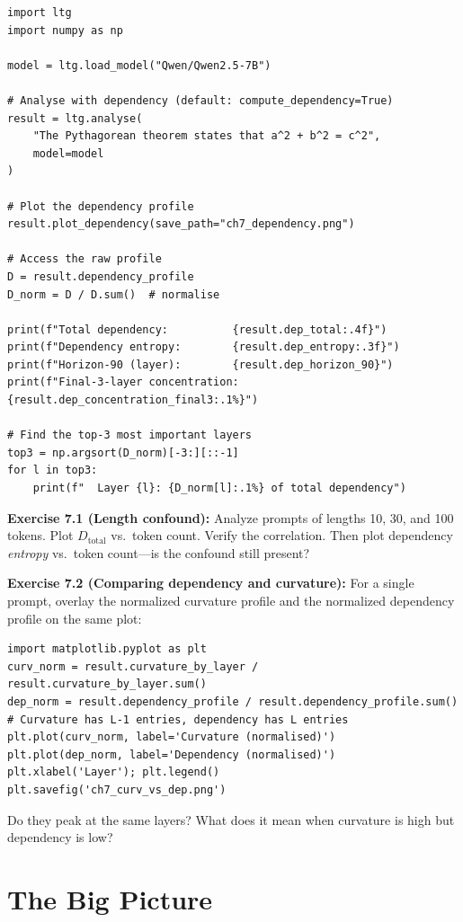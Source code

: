 \documentclass[11pt, twoside, openright]{memoir}
\begin{document}
\begin{lstlisting}[caption={Computing and visualising dependency profiles}]
import ltg
import numpy as np

model = ltg.load_model("Qwen/Qwen2.5-7B")

# Analyse with dependency (default: compute_dependency=True)
result = ltg.analyse(
    "The Pythagorean theorem states that a^2 + b^2 = c^2",
    model=model
)

# Plot the dependency profile
result.plot_dependency(save_path="ch7_dependency.png")

# Access the raw profile
D = result.dependency_profile
D_norm = D / D.sum()  # normalise

print(f"Total dependency:          {result.dep_total:.4f}")
print(f"Dependency entropy:        {result.dep_entropy:.3f}")
print(f"Horizon-90 (layer):        {result.dep_horizon_90}")
print(f"Final-3-layer concentration: {result.dep_concentration_final3:.1%}")

# Find the top-3 most important layers
top3 = np.argsort(D_norm)[-3:][::-1]
for l in top3:
    print(f"  Layer {l}: {D_norm[l]:.1%} of total dependency")
\end{lstlisting}

\begin{tryit}
\textbf{Exercise 7.1 (Length confound):} Analyze prompts of lengths 10, 30,
and 100 tokens. Plot $D_{\text{total}}$ vs.\ token count. Verify the
correlation. Then plot dependency \emph{entropy} vs.\ token count---is the
confound still present?

\textbf{Exercise 7.2 (Comparing dependency and curvature):} For a single
prompt, overlay the normalized curvature profile and the normalized
dependency profile on the same plot:
\begin{lstlisting}
import matplotlib.pyplot as plt
curv_norm = result.curvature_by_layer / result.curvature_by_layer.sum()
dep_norm = result.dependency_profile / result.dependency_profile.sum()
# Curvature has L-1 entries, dependency has L entries
plt.plot(curv_norm, label='Curvature (normalised)')
plt.plot(dep_norm, label='Dependency (normalised)')
plt.xlabel('Layer'); plt.legend()
plt.savefig('ch7_curv_vs_dep.png')
\end{lstlisting}
Do they peak at the same layers? What does it mean when curvature is high
but dependency is low?
\end{tryit}


\part{The Big Picture}
\end{document}
